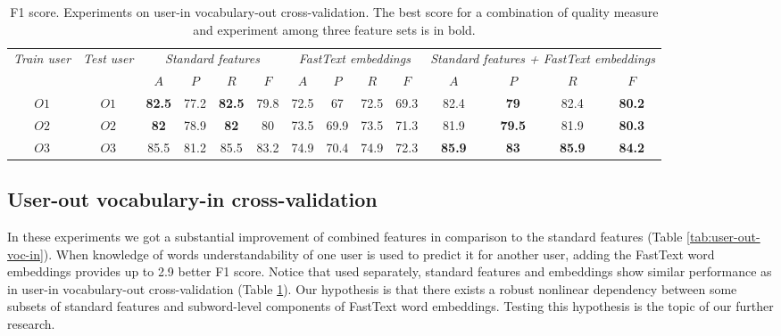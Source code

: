 \begin{table}[h]
\begin{tabular}{cc|cccc|cccc|cccc}
\multirow{2}{0.6cm}{\textit{Train user}} & \multirow{2}{0.6cm}{\textit{Test user}} & \multicolumn{4}{c|}{\textit{Standard features}} & \multicolumn{4}{c|}{\textit{FastText embeddings}} & \multicolumn{4}{X}{\textit{Standard features + FastText embeddings}} \\ \cline{3-14} 
 &  & $A$ & $P$ & $R$ & $F$ & $A$ & $P$ & $R$ & $F$ & $A$ & $P$ & $R$ & $F$ \\ \hline
$O1$ & $O1$ & \textbf{82.5} & 77.2 & \textbf{82.5} & 79.8 & 72.5 & 67 & 72.5 & 69.3 & 82.4 & \textbf{79} & 82.4 & \textbf{80.2} \\
$O2$ & $O2$ & \textbf{82} & 78.9 & \textbf{82} & 80 & 73.5 & 69.9 & 73.5 & 71.3 & 81.9 & \textbf{79.5} & 81.9 & \textbf{80.3} \\ 
$O3$ & $O3$ & 85.5 & 81.2 & 85.5 & 83.2 & 74.9 & 70.4 & 74.9 & 72.3 & \textbf{85.9} & \textbf{83} & \textbf{85.9} & \textbf{84.2} \\ \hline 
\end{tabular}
    \caption{F1 score. Experiments on user-in vocabulary-out cross-validation. The best score for a combination of quality measure and experiment among three feature sets is in bold.}
    \label{tab:user-in-voc-out}
\end{table}


\subsection{User-out vocabulary-in cross-validation}

In these experiments we got a substantial improvement of combined features in comparison to the standard features (Table \ref{tab:user-out-voc-in}). When knowledge of words understandability of one user is used to predict it for another user, adding the FastText word embeddings provides up to 2.9 better F1 score. Notice that used separately, standard features and embeddings show similar performance as in user-in vocabulary-out cross-validation (Table \ref{tab:user-in-voc-out}). Our hypothesis is that there exists a robust nonlinear dependency between some subsets of standard features and subword-level components of FastText word embeddings. Testing this hypothesis is the topic of our further research.

